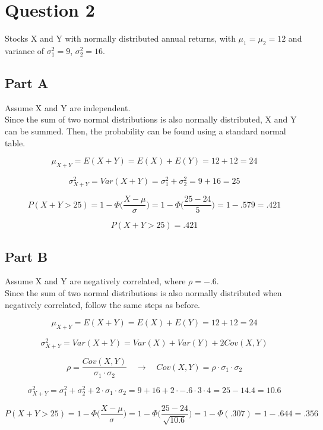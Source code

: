 \documentclass[letterpaper]{article}
\begin{document}
\newpage

\section*{Question 2}

Stocks X and Y with normally distributed annual returns, with $\mu_1 = \mu_2 = 12$ and variance of $\sigma_1^2 = 9$, $\sigma_2^2 = 16$.

\subsection*{Part A}

Assume X and Y are independent.\\

\noindent Since the sum of two normal distributions is also normally distributed, X and Y can be summed. Then, the probability can be found using a standard normal table.

$$\mu_{X+Y} = E(X+Y) = E(X) + E(Y) = 12 + 12 = 24$$

$$\sigma^2_{X+Y} = Var(X+Y) = \sigma_1^2 + \sigma_2^2 = 9 + 16 = 25$$

$$P(X+Y > 25) = 1 - \Phi \Big( \frac{X - \mu}{\sigma} \Big) = 1 - \Phi \Big( \frac{25 - 24}{5} \Big) = 1 - .579 = .421$$

$$P(X+Y > 25) = .421$$

\subsection*{Part B}

Assume X and Y are negatively correlated, where $\rho = -.6$.\\

\noindent Since the sum of two normal distributions is also normally distributed when negatively correlated, follow the same steps as before.

$$\mu_{X+Y} = E(X+Y) = E(X) + E(Y) = 12 + 12 = 24$$

$$\sigma^2_{X+Y} = Var(X+Y) = Var(X) + Var(Y) + 2Cov(X,Y)$$

$$\rho = \frac{Cov(X, Y)}{\sigma_1 \cdot \sigma_2} \quad \rightarrow \quad Cov(X, Y) = \rho \cdot \sigma_1 \cdot \sigma_2$$

$$\sigma^2_{X+Y} = \sigma_1^2 + \sigma_2^2 + 2 \cdot \sigma_1 \cdot \sigma_2 = 9 + 16 + 2 \cdot -.6 \cdot 3 \cdot 4 = 25 - 14.4 = 10.6$$

$$P(X+Y > 25) = 1 - \Phi \Big( \frac{X - \mu}{\sigma} \Big) = 1 - \Phi \Big( \frac{25 - 24}{\sqrt{10.6}} \Big) = 1 - \Phi(.307) = 1 - .644 = .356$$
\end{document}

